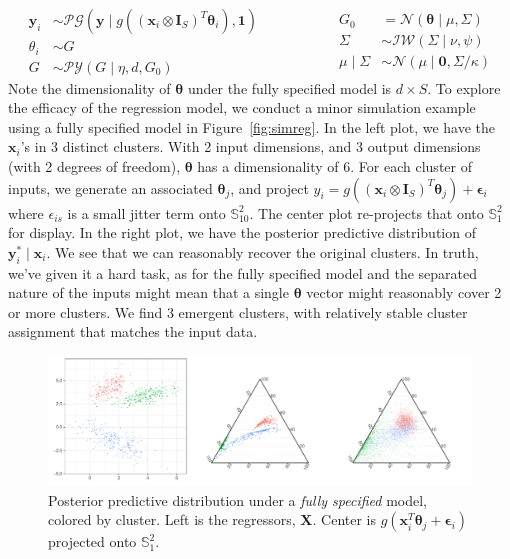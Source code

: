     \begin{equation}
        \label{eqn:regressionmodel}
        \begin{aligned}
            \bm{y}_i &\sim \mathcal{PG}\left(\bm{y}\mid g\left((\bm{x}_i\otimes\bm{I}_S)^T\bm{\theta}_i\right), \bm{1}\right)\\
            \theta_i &\sim G\\
            G &\sim \mathcal{PY}(G\mid\eta, d, G_0)
        \end{aligned}
        ~\hspace{2cm}
        \begin{aligned}
            G_0 &= \mathcal{N}(\bm{\theta} \mid \mu, \Sigma)\\
            \Sigma &\sim \mathcal{IW}(\Sigma\mid \nu, \psi)\\
            \mu\mid\Sigma &\sim \mathcal{N}(\mu\mid \bm{0}, \Sigma / \kappa)
        \end{aligned}
    \end{equation}
    Note the dimensionality of $\bm{\theta}$ under the fully specified model is $d\times S$.
    To explore the efficacy of the regression model, we conduct a minor simulation example using a 
    fully specified model in Figure~\ref{fig:simreg}.  In the left plot, we have the $\bm{x}_i$'s in
    3 distinct clusters. With 2 input dimensions, and 3 output dimensions 
    (with 2 degrees of freedom), $\bm{\theta}$ has a dimensionality of 6. For each cluster
    of inputs, we generate an associated $\bm{\theta}_j$, and project 
    $y_i = g\left((\bm{x}_i\otimes\bm{I}_S)^T\bm{\theta}_j\right) + \bm{\epsilon}_i$ where 
    $\epsilon_{is}$ is a small jitter term onto 
    $\mathbb{S}_{10}^{2}$.  The center plot re-projects that onto $\mathbb{S}_1^{2}$ for display.
    In the right plot, we have the posterior predictive distribution of $\bm{y}_i^{*}\mid \bm{x}_i$.
    We see that we can reasonably recover the original clusters.  In truth, we've given it a hard
    task, as for the fully specified model and the separated nature of the inputs might mean that 
    a single $\bm{\theta}$ vector might reasonably cover 2 or more clusters.  We find 3 emergent
    clusters, with relatively stable cluster assignment that matches the input data.

\begin{figure}[t]
    \centering
    \caption{Posterior predictive distribution under a \emph{fully specified} model, colored 
        by cluster.  Left is the regressors, $\bm{X}$.  Center is 
        $g(\bm{x}_i^T\bm{\theta}_j + \bm{\epsilon}_i)$ projected onto $\mathbb{S}_1^2$.}
    \includegraphics[width = \textwidth]{plots/simulated_reg}
\end{figure}

